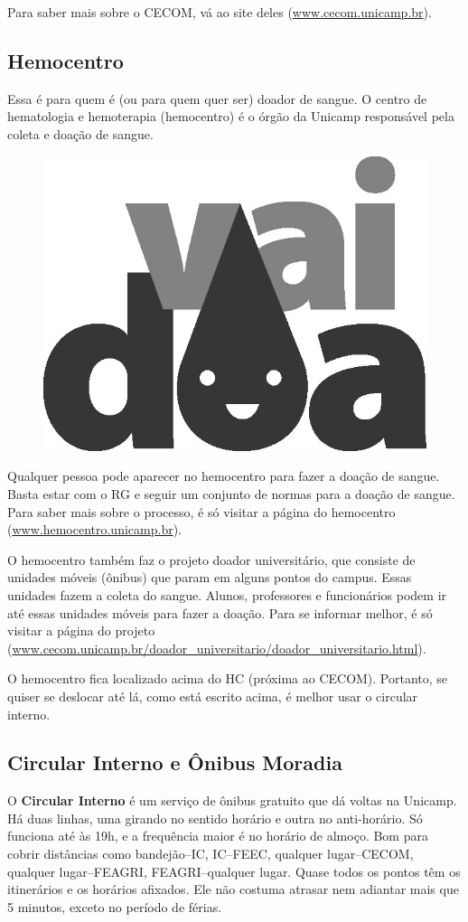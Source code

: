 Para saber mais sobre o CECOM, vá ao site deles (\url{www.cecom.unicamp.br}).

\subsection{Hemocentro}

Essa é para quem é (ou para quem quer ser) doador de sangue. O centro de
hematologia e hemoterapia (hemocentro) é o órgão da Unicamp responsável pela
coleta e doação de sangue.
\begin{figure}
    \centering
    \includegraphics[width=.2\textwidth]{img/alem_da_graduacao/doe_sangue.jpg}
\end{figure}
Qualquer pessoa pode aparecer no hemocentro para fazer a doação de sangue. Basta
estar com o RG e seguir um conjunto de normas para a doação de sangue. Para
saber mais sobre o processo, é só visitar a página do hemocentro
(\url{www.hemocentro.unicamp.br}).


O hemocentro também faz o projeto doador universitário, que consiste de unidades
móveis (ônibus) que param em alguns pontos do campus. Essas unidades fazem a
coleta do sangue. Alunos, professores e funcionários podem ir até essas unidades
móveis para fazer a doação. Para se informar melhor, é só visitar a página do
projeto
(\url{www.cecom.unicamp.br/doador_universitario/doador_universitario.html}).

O hemocentro fica localizado acima do HC (próxima ao CECOM). Portanto, se quiser
se deslocar até lá, como está escrito acima, é melhor usar o circular interno.

\subsection{Circular Interno e Ônibus Moradia}

O \textbf{Circular Interno} é um serviço de ônibus gratuito que dá voltas na
Unicamp. Há duas linhas, uma girando no sentido horário e outra no anti-horário.
Só funciona até às 19h, e a frequência maior é no horário de almoço. Bom para
cobrir distâncias como bandejão--IC, IC--FEEC, qualquer lugar--CECOM, qualquer
lugar--FEAGRI, FEAGRI--qualquer lugar. Quase todos os pontos têm os itinerários
e os horários afixados.  Ele não costuma atrasar nem adiantar mais que 5
minutos, exceto no período de férias.

